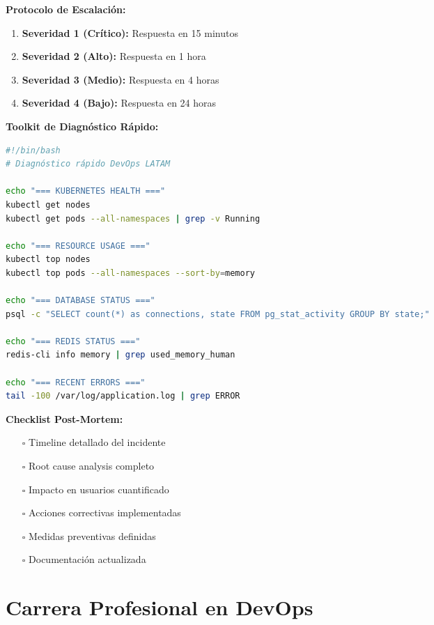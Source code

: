 \documentclass[12pt,a4paper]{article}
\begin{document}
\textbf{Protocolo de Escalación:}
\begin{enumerate}
    \item \textbf{Severidad 1 (Crítico):} Respuesta en 15 minutos
    \item \textbf{Severidad 2 (Alto):} Respuesta en 1 hora
    \item \textbf{Severidad 3 (Medio):} Respuesta en 4 horas
    \item \textbf{Severidad 4 (Bajo):} Respuesta en 24 horas
\end{enumerate}

\textbf{Toolkit de Diagnóstico Rápido:}
\begin{lstlisting}[language=bash, caption=Script de diagnóstico esencial]
#!/bin/bash
# Diagnóstico rápido DevOps LATAM

echo "=== KUBERNETES HEALTH ==="
kubectl get nodes
kubectl get pods --all-namespaces | grep -v Running

echo "=== RESOURCE USAGE ==="
kubectl top nodes
kubectl top pods --all-namespaces --sort-by=memory

echo "=== DATABASE STATUS ==="
psql -c "SELECT count(*) as connections, state FROM pg_stat_activity GROUP BY state;"

echo "=== REDIS STATUS ==="
redis-cli info memory | grep used_memory_human

echo "=== RECENT ERRORS ==="
tail -100 /var/log/application.log | grep ERROR
\end{lstlisting}

\textbf{Checklist Post-Mortem:}
\begin{itemize}
    \item[$\square$] Timeline detallado del incidente
    \item[$\square$] Root cause analysis completo
    \item[$\square$] Impacto en usuarios cuantificado
    \item[$\square$] Acciones correctivas implementadas
    \item[$\square$] Medidas preventivas definidas
    \item[$\square$] Documentación actualizada
\end{itemize}

\section{Carrera Profesional en DevOps}
\end{document}
